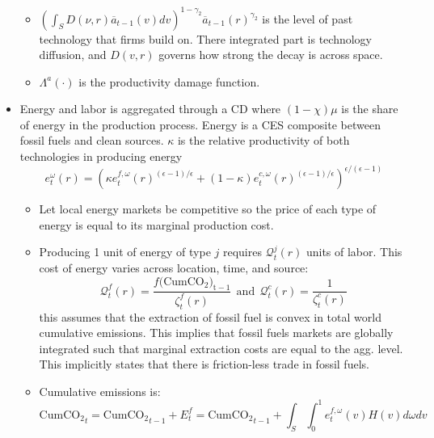 \documentclass[12pt]{amsart}
\begin{document}
\begin{itemize}
\begin{itemize}
        \item $\left(\int_S D(\nu,r) \overline{a}_{t-1}(v) dv \right)^{1-\gamma_2} \overline{a}_{t-1}(r)^{\gamma_2}$ is the level of past technology that firms build on. There integrated part is technology diffusion, and $D(v,r)$ governs how strong the decay is across space.
        \item $\Lambda^a(\cdot)$ is the productivity damage function.
    \end{itemize}
    \item Energy and labor is aggregated through a CD where $(1-\chi)\mu$ is the share of energy in the production process. Energy is a CES composite between fossil fuels and clean sources. $\kappa$ is the relative productivity of both technologies in producing energy 
    \begin{equation}
        e_t^\omega(r) = \left(\kappa e_t^{f,\omega}(r)^{(\epsilon-1)/\epsilon} +(1-\kappa) e_t^{c,\omega}(r)^{(\epsilon-1)/\epsilon}\right)^{\epsilon/(\epsilon-1)} \label{eq:energy_agg}
    \end{equation}
    \begin{itemize}
        \item Let local energy markets be competitive so the price of each type of energy is equal to its marginal production cost.
        \item Producing 1 unit of energy of type $j$ requires $\mathcal{Q}_t^j(r)$ units of labor. This cost of energy varies across location, time, and source:
        \begin{equation}
            \mathcal{Q}_t^f(r) = \frac{f(\operatorname{CumCO_2)_{t-1}}}{\zeta_t^f(r)} ~~ \text{and} ~~ \mathcal{Q}_t^c(r) = \frac{1}{\zeta_t^c(r)} \label{eq:energy_cost}
        \end{equation}
        this assumes that the extraction of fossil fuel is convex in total world cumulative emissions. This implies that fossil fuels markets are globally integrated such that marginal extraction costs are equal to the agg. level. This implicitly states that there is friction-less trade in fossil fuels.
        \item Cumulative emissions is:
        \begin{equation}
            \operatorname{CumCO_2}_t = \operatorname{CumCO_2}_{t-1} + E_t^f = \operatorname{CumCO_2}_{t-1} + \int_S \int_0^1 e_t^{f,\omega}(v) H(v) d\omega dv \label{eq:cumulative_emissions}

\end{equation}
\end{itemize}
\end{itemize}
\end{document}
